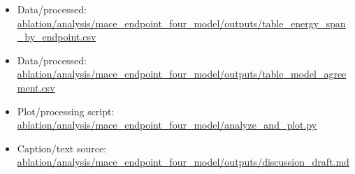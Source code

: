 \begin{itemize}[leftmargin=1.4em,noitemsep]
\item Data/processed: \begingroup\scriptsize\url{ablation/analysis/mace_endpoint_four_model/outputs/table_energy_span_by_endpoint.csv}\endgroup
\item Data/processed: \begingroup\scriptsize\url{ablation/analysis/mace_endpoint_four_model/outputs/table_model_agreement.csv}\endgroup
\item Plot/processing script: \begingroup\scriptsize\url{ablation/analysis/mace_endpoint_four_model/analyze_and_plot.py}\endgroup
\item Caption/text source: \begingroup\scriptsize\url{ablation/analysis/mace_endpoint_four_model/outputs/discussion_draft.md}\endgroup
\end{itemize}
